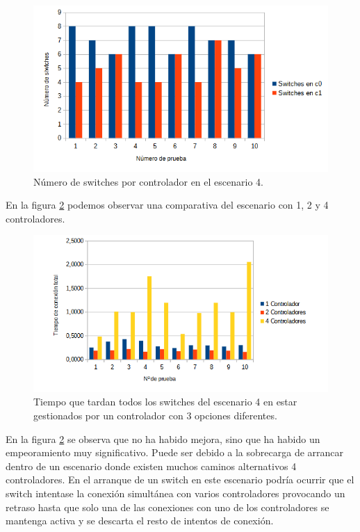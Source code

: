 \documentclass[a4paper, 12pt]{book}
\begin{document}
	\begin{figure}[H]
		\centering
		\includegraphics[width=14cm, keepaspectratio]{img/switchesporcontrollerescenario3}
		\caption{Número de switches por controlador en el escenario 4.}
		\label{figura:switchesporcontrollerescenario4}
	\end{figure}
	

	
En la figura \ref{figura:comparativaFail} podemos observar una comparativa del escenario con 1, 2 y 4 controladores.
	
	\begin{figure}[H]
		\centering
		\includegraphics[width=16cm, keepaspectratio]{img/comparativaFail}
		\caption{Tiempo que tardan todos los switches del escenario 4 en estar gestionados por un controlador con 3 opciones diferentes.}
		\label{figura:comparativaFail}
	\end{figure}
	
	En la figura \ref{figura:comparativaFail} se observa que no ha habido mejora, sino que ha habido un empeoramiento muy  significativo. Puede ser debido a la sobrecarga de arrancar dentro de un escenario donde existen muchos caminos alternativos 4 controladores. En el arranque de un switch en este escenario podría ocurrir que el switch intentase la conexión simultánea con varios controladores provocando un retraso hasta que solo una de las conexiones con uno de los controladores se mantenga activa y se descarta el resto de intentos de conexión.
	
\end{document}
